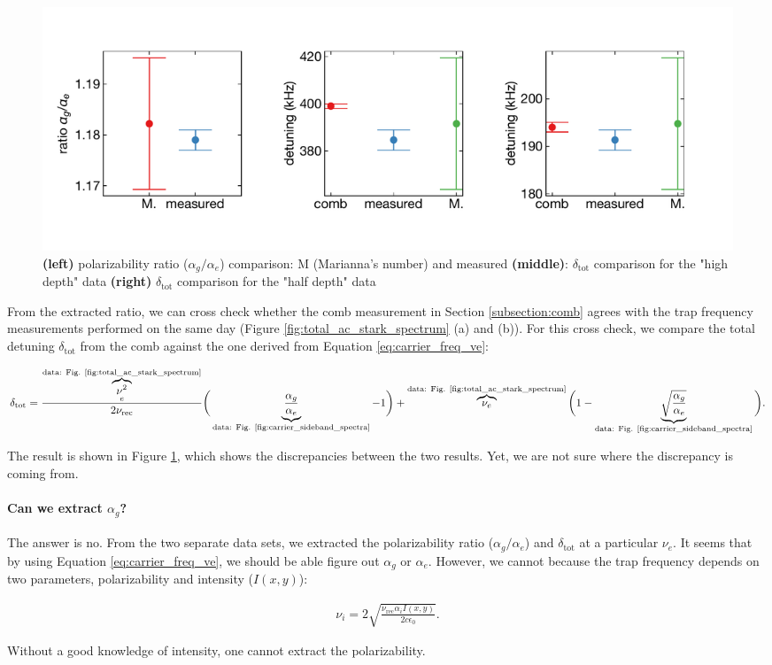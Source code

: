 		\begin{figure}
		    \hspace*{-0.5cm}
		    \includegraphics[scale=0.6]{figures/ratio_comparison_plot.pdf}
		    \caption{\textbf{(left)} polarizability ratio ($\alpha_g/\alpha_e$) comparison: M (Marianna's number) and measured \textbf{(middle)}: $\delta_{\text{tot}}$ comparison for the "high depth" data \textbf{(right)} $\delta_{\text{tot}}$ comparison for the "half depth" data}
		    \label{fig:ratio_comparison_plot}
		\end{figure}

		\noindent From the extracted ratio, we can cross check whether the comb measurement in Section \ref{subsection:comb} agrees with the trap frequency measurements performed on the same day (Figure \ref{fig:total_ac_stark_spectrum} (a) and (b)). For this cross check, we compare the total detuning $\delta_{\text{tot}}$ from the comb against the one derived from Equation \ref{eq:carrier_freq_ve}:

		\begin{align*}
		\delta_{\text{tot}}=\frac{\overbrace{\nu^{2}}^{\text{data: Fig. \ref{fig:total_ac_stark_spectrum}}}_e}{2\nu_{\text{rec}}}\bigg(\underbrace{\frac{\alpha_g}{\alpha_e}}_{\text{data: Fig. \ref{fig:carrier_sideband_spectra}}}-1\bigg) + \overbrace{\nu_e}^{\text{data: Fig. \ref{fig:total_ac_stark_spectrum}}}\bigg(1-\underbrace{\sqrt{\frac{\alpha_g}{\alpha_e}}}_{\text{data: Fig. \ref{fig:carrier_sideband_spectra}}}\bigg).
		\end{align*}

		The result is shown in Figure \ref{fig:ratio_comparison_plot}, which shows the discrepancies between the two results. Yet, we are not sure where the discrepancy is coming from.

		\paragraph{Can we extract $\alpha_g$?}
			The answer is no. From the two separate data sets, we extracted the polarizability ratio ($\alpha_g/\alpha_e$) and $\delta_{\text{tot}}$ at a particular $\nu_e$. It seems that by using Equation \ref{eq:carrier_freq_ve}, we should be able figure out $\alpha_g$ or $\alpha_e$. However, we cannot because the trap frequency depends on two parameters, polarizability and intensity ($I(x,y)$):

			\begin{align*}
				\nu_i=2\sqrt{\frac{\nu_{\text{rec}}\alpha_i I(x,y)}{2c\epsilon_0}}.
			\end{align*}

			\noindent Without a good knowledge of intensity, one cannot extract the polarizability. 